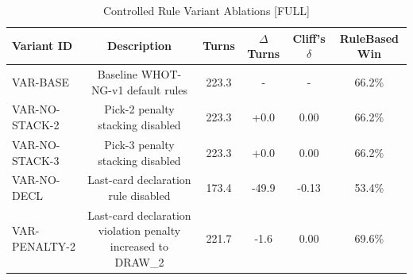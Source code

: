 \begin{table}[ht]
\centering
\caption{Controlled Rule Variant Ablations [FULL]}
\begin{tabular}{lccccc}
\hline
Variant ID & Description & Turns & $\Delta$ Turns & Cliff's $\delta$ & RuleBased Win \\
\hline
VAR-BASE & Baseline WHOT-NG-v1 default rules & 223.3 & - & - & 66.2\% \\
VAR-NO-STACK-2 & Pick-2 penalty stacking disabled & 223.3 & +0.0 & 0.00 & 66.2\% \\
VAR-NO-STACK-3 & Pick-3 penalty stacking disabled & 223.3 & +0.0 & 0.00 & 66.2\% \\
VAR-NO-DECL & Last-card declaration rule disabled & 173.4 & -49.9 & -0.13 & 53.4\% \\
VAR-PENALTY-2 & Last-card declaration violation penalty increased to DRAW_2 & 221.7 & -1.6 & 0.00 & 69.6\% \\
\hline
\end{tabular}
\end{table}
